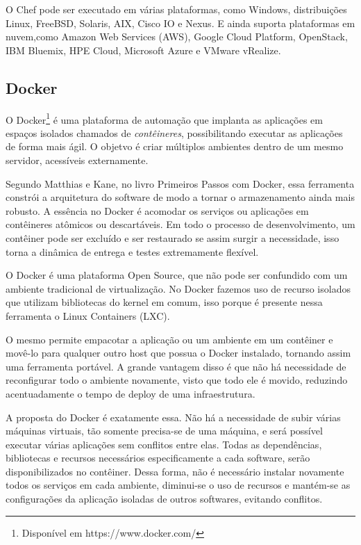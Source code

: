 O Chef pode ser executado em várias plataformas, como Windows, distribuições Linux, FreeBSD, Solaris, AIX, Cisco IO e Nexus. E ainda suporta plataformas em nuvem,como Amazon Web Services (AWS), Google Cloud Platform, OpenStack, IBM Bluemix, HPE Cloud, Microsoft Azure e VMware vRealize.

\subsection{Docker}

O Docker\footnote{Disponível em https://www.docker.com/} é uma plataforma de automação que implanta as aplicações em espaços isolados chamados de \textit{contêineres}, possibilitando executar as aplicações de forma mais ágil. O objetvo é criar múltiplos ambientes dentro de um mesmo servidor, acessíveis externamente.

Segundo Matthias e Kane, no livro Primeiros Passos com Docker, essa ferramenta constrói a arquitetura do software de modo a tornar o armazenamento ainda mais robusto. A essência no Docker é acomodar os serviços ou aplicações em contêineres atômicos ou descartáveis. Em todo o processo de desenvolvimento, um contêiner pode ser excluído e ser restaurado se assim surgir a necessidade, isso torna a dinâmica de entrega e testes extremamente flexível.\cite{mattiaskane}

O Docker é uma plataforma Open Source, que não pode ser confundido com um ambiente tradicional de virtualização. No Docker fazemos uso de recurso isolados que utilizam bibliotecas do kernel em comum, isso porque é presente nessa ferramenta o Linux Containers (LXC).

O mesmo permite empacotar a aplicação ou um ambiente em um contêiner e movê-lo para qualquer outro host que possua o Docker instalado, tornando assim uma ferramenta portável. A grande vantagem disso é que não há necessidade de reconfigurar todo o ambiente novamente, visto que todo ele é movido, reduzindo acentuadamente o tempo de deploy de uma infraestrutura.


A proposta do Docker é exatamente essa. Não há a necessidade de subir várias máquinas virtuais, tão somente precisa-se de uma máquina, e será possível executar várias aplicações sem conflitos entre elas. Todas as dependências, bibliotecas e recursos necessários especificamente a cada software, serão disponibilizados no contêiner. Dessa forma, não é necessário instalar novamente todos os serviços em cada ambiente, diminui-se o uso de recursos e mantém-se as configurações da aplicação isoladas de outros softwares, evitando conflitos. \cite{scampini}

